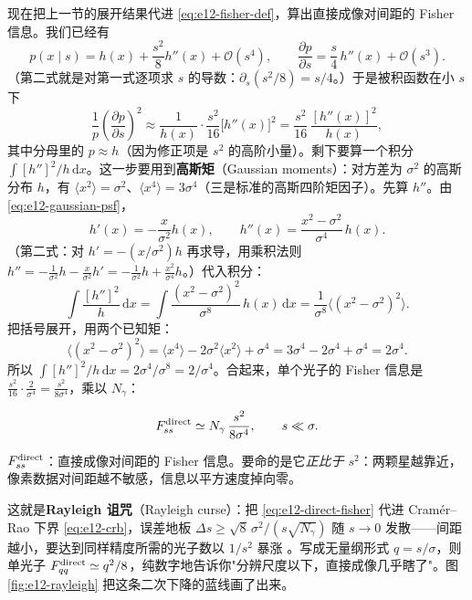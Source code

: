 现在把上一节的展开结果代进 \eqref{eq:e12-fisher-def}，算出直接成像对间距的 Fisher 信息。我们已经有
\[
  p(x\mid s)=h(x)+\frac{s^{2}}{8}h''(x)+\mathcal{O}(s^{4}),
  \qquad
  \frac{\partial p}{\partial s}=\frac{s}{4}\,h''(x)+\mathcal{O}(s^{3}).
\]
（第二式就是对第一式逐项求 \(s\) 的导数：\(\partial_s(s^2/8)=s/4\)。）于是被积函数在小 \(s\) 下
\[
  \frac{1}{p}\left(\frac{\partial p}{\partial s}\right)^{2}
  \approx\frac{1}{h(x)}\cdot\frac{s^{2}}{16}\big[h''(x)\big]^{2}
  =\frac{s^{2}}{16}\,\frac{[h''(x)]^{2}}{h(x)},
\]
其中分母里的 \(p\approx h\)（因为修正项是 \(s^2\) 的高阶小量）。剩下要算一个积分 \(\int [h'']^2/h\,\mathrm{d}x\)。这一步要用到\textbf{高斯矩}（Gaussian moments）：对方差为 \(\sigma^2\) 的高斯分布 \(h\)，有 \(\langle x^2\rangle=\sigma^2\)、\(\langle x^4\rangle=3\sigma^4\)（三是标准的高斯四阶矩因子）。先算 \(h''\)。由 \eqref{eq:e12-gaussian-psf}，
\[
  h'(x)=-\frac{x}{\sigma^{2}}h(x),\qquad
  h''(x)=\frac{x^{2}-\sigma^{2}}{\sigma^{4}}\,h(x).
\]
（第二式：对 \(h'=-(x/\sigma^2)h\) 再求导，用乘积法则 \(h''=-\tfrac1{\sigma^2}h-\tfrac{x}{\sigma^2}h'=-\tfrac1{\sigma^2}h+\tfrac{x^2}{\sigma^4}h\)。）代入积分：
\[
  \int\frac{[h'']^{2}}{h}\,\mathrm{d}x
  =\int\frac{(x^{2}-\sigma^{2})^{2}}{\sigma^{8}}\,h(x)\,\mathrm{d}x
  =\frac{1}{\sigma^{8}}\big\langle(x^{2}-\sigma^{2})^{2}\big\rangle.
\]
把括号展开，用两个已知矩：
\[
  \big\langle(x^{2}-\sigma^{2})^{2}\big\rangle
  =\langle x^{4}\rangle-2\sigma^{2}\langle x^{2}\rangle+\sigma^{4}
  =3\sigma^{4}-2\sigma^{4}+\sigma^{4}=2\sigma^{4}.
\]
所以 \(\int[h'']^2/h\,\mathrm{d}x=2\sigma^4/\sigma^8=2/\sigma^4\)。合起来，单个光子的 Fisher 信息是 \(\tfrac{s^2}{16}\cdot\tfrac{2}{\sigma^4}=\tfrac{s^2}{8\sigma^4}\)，乘以 \(N_\gamma\)：

\begin{equation}
  F_{ss}^{\rm direct}\simeq N_\gamma\,\frac{s^{2}}{8\sigma^{4}},
  \qquad s\ll\sigma.
  \label{eq:e12-direct-fisher}
\end{equation}
\begin{formulaexplain}
\(F_{ss}^{\rm direct}\)：直接成像对间距的 Fisher 信息。要命的是它\emph{正比于 \(s^{2}\)}：两颗星越靠近，像素数据对间距越不敏感，信息以平方速度掉向零。
\end{formulaexplain}

这就是\textbf{Rayleigh 诅咒}（Rayleigh curse）：把 \eqref{eq:e12-direct-fisher} 代进 Cramér--Rao 下界 \eqref{eq:e12-crb}，误差地板 \(\Delta s\ge \sqrt{8}\,\sigma^2/(s\sqrt{N_\gamma})\) 随 \(s\to0\) 发散——间距越小，要达到同样精度所需的光子数以 \(1/s^2\) 暴涨 \citep{2016PhRvX...6c1033T,2018Optic...5.1177P}。写成无量纲形式 \(q=s/\sigma\)，则单光子 \(F_{qq}^{\rm direct}\simeq q^2/8\)，纯数字地告诉你"分辨尺度以下，直接成像几乎瞎了"。图 \ref{fig:e12-rayleigh} 把这条二次下降的蓝线画了出来。

